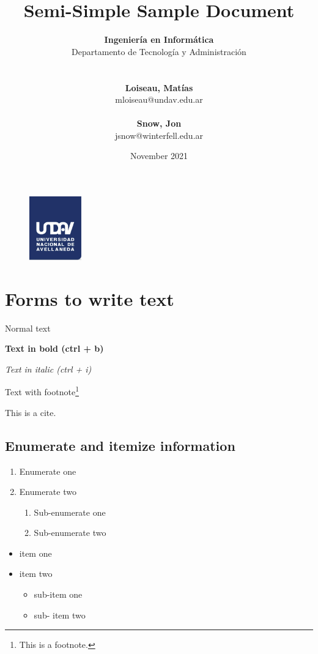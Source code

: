 \documentclass{article} %
\title{Semi-Simple Sample Document} %
\date{November 2021} %
\author{
	\textbf{Ingeniería en Informática}\\
	Departamento de Tecnología y Administración\\
	\\~\\
	\textbf{Loiseau, Matías}\\
	mloiseau@undav.edu.ar
 	\\~\\
 	\textbf{Snow, Jon}\\
 	jsnow@winterfell.edu.ar
}
\begin{document}

\begin{figure}
\centering
	\includegraphics[width=0.2\textwidth]{images/undav-logo}
	\label{fig:undav-logo}
\end{figure}
\maketitle %

\thispagestyle{empty} %
\cleardoublepage

\cleardoublepage
\tableofcontents %
\cleardoublepage

\section{Forms to write text} %
Normal text

\textbf{Text in bold (ctrl + b)}

\textit{Text in italic (ctrl + i)}

Text with footnote\footnote{This is a footnote.}

This is a cite\cite{knn}.

\subsection{Enumerate and itemize information}

\begin{enumerate}
	\item Enumerate one
	\item Enumerate two
	\begin{enumerate}
		\item Sub-enumerate one
		\item Sub-enumerate two
	\end{enumerate}
\end{enumerate}

\begin{itemize}
	\item item one
	\item item two
	\begin{itemize}
		\item sub-item one
		\item sub-	item two
	\end{itemize}
\end{itemize}
\end{document}

